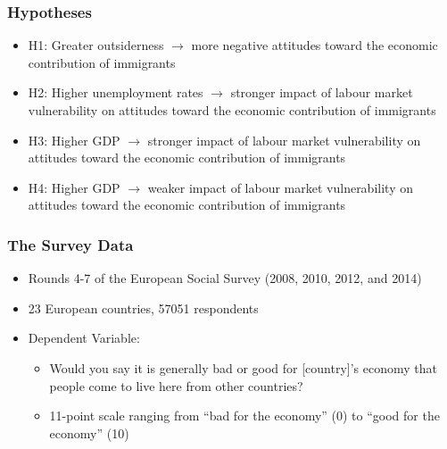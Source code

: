 \documentclass[14pt]{beamer}
\begin{document}
\begin{frame}
	\frametitle{Hypotheses}
	\begin{itemize}
		\item H1: Greater outsiderness $\rightarrow$ more negative attitudes toward the economic contribution of immigrants 
		\pause
		\item H2: Higher unemployment rates $\rightarrow$ stronger impact of labour market vulnerability on attitudes toward the economic contribution of immigrants 
		\pause
		\item H3: Higher GDP $\rightarrow$ stronger impact of labour market vulnerability on attitudes toward the economic contribution of immigrants 
		\pause
		\item H4: Higher GDP $\rightarrow$ weaker impact of labour market vulnerability on attitudes toward the economic contribution of immigrants 
	\end{itemize}
\end{frame}

\begin{frame}
	\frametitle{The Survey Data}
	\begin{itemize}
		\item Rounds 4-7 of the European Social Survey (2008, 2010, 2012, and 2014)
		\pause
		\item 23 European countries, 57051 respondents 
		\pause
		\item Dependent Variable:
		\begin{itemize}
			\pause
			\item Would you say it is generally bad or good for [country]’s economy that people come to live here from other countries?
			\pause
			\item 11-point scale ranging from ``bad for the economy'' (0) to ``good for the economy'' (10)
		\end{itemize}
	\end{itemize}
\end{frame}
\end{document}
